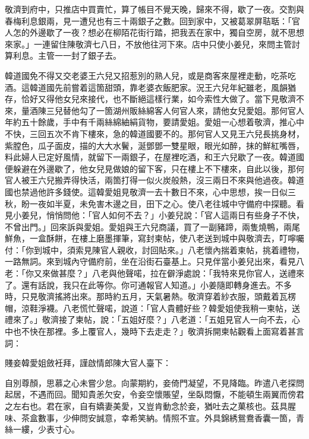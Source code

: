 敬濟到府中，只推店中買賣忙，算了帳目不覺天晚，歸來不得，歇了一夜。交割與春梅利息銀兩，見一遭兒也有三十兩銀子之數。回到家中，又被葛翠屏聐聒：「官人怎的外邊歇了一夜？想必在柳陌花街行踏，把我丟在家中，獨自空房，就不思想來家。」一連留住陳敬濟七八日，不放他往河下來。店中只使小姜兒，來問主管討算利息。主管一一封了銀子去。

韓道國免不得又交老婆王六兒又招惹別的熟人兒，{}或是商客來屋裡走動，吃茶吃酒。這韓道國先前嘗着這箇甜頭，靠老婆衣飯肥家。況王六兒年紀雖老，風韻猶存，恰好又得他女兒來接代，也不斷絕這樣行業，如今索性大做了。當下見敬濟不來，量酒陳三兒替他勾了一箇湖州販絲綿客人何官人來，請他女兒愛姐。那何官人年約五十餘歲，手中有千兩絲綿紬絹貨物，要請愛姐。愛姐一心想着敬濟，推心中不快，三回五次不肯下樓來，急的韓道國要不的。那何官人又見王六兒長挑身材，紫膛色，瓜子面皮，描的大大水鬢，涎鄧鄧一雙星眼，眼光如醉，抹的鮮紅嘴唇，料此婦人已定好風情，{}就留下一兩銀子，在屋裡吃酒，和王六兒歇了一夜。韓道國便躲避在外邊歇了，他女兒見做娘的留下客，只在樓上不下樓來，自此以後，那何官人被王六兒搬弄得快活，兩箇打得一似火炭般熱，沒三兩日不來與他過夜。韓道國也禁過他許多錢使。{}這韓愛姐見敬濟一去十數日不來，心中思想，挨一日似三秋，盼一夜如半夏，未免害木邊之目，田下之心。使八老往城中守備府中探聽。看見小姜兒，悄悄問他：「官人如何不去？」小姜兒說：「官人這兩日有些身子不快，不曾出門。」回來訴與愛姐。愛姐與王六兒商議，買了一副豬蹄，兩隻燒鴨，兩尾鮮魚，一盒酥餅，在樓上磨墨揮筆，寫封柬帖，使八老送到城中與敬濟去，叮嚀囑付：「你到城中，須索見陳官人親收，討回貼來。」八老懷內揣着柬帖，挑着禮物，一路無詞。來到城內守備府前，坐在沿街石臺基上。只見伴當小姜兒出來，看見八老：「你又來做甚麼？」八老與他聲喏，拉在僻淨處說：「我特來見你官人，送禮來了。還有話說，我只在此等你。你可通報官人知道。」小姜隨即轉身進去。不多時，只見敬濟搖將出來。那時約五月，天氣暑熱。敬濟穿着紗衣服，頭戴着瓦楞帽，涼鞋淨襪。八老慌忙聲喏，說道：「官人貴體好些？韓愛姐使我稍一柬帖，送禮來了。」敬濟接了柬帖，說：「五姐好麼？」八老道：「五姐見官人一向不去，心中也不快在那裡。多上覆官人，幾時下去走走？」敬濟拆開柬帖觀看上面寫着甚言詞：

\begin{myquote}[\markfont]
賤妾韓愛姐斂衽拜，謹啟情郎陳大官人臺下：

自別尊顏，思慕之心未嘗少怠。向蒙期約，妾倚門凝望，不見降臨。昨遣八老探問起居，不遇而回。聞知貴恙欠安，令妾空懷賬望，坐臥悶懨，不能頓生兩翼而傍君之左右也。君在家，自有嬌妻美愛，又豈肯動念於妾，猶吐去之菓核也。茲具腥味、茶盒數事，少伸問安誠意，幸希笑納。情照不宣。{}外具錦綉鴛鴦香囊一箇，青絲一縷，少表寸心。

\end{myquote}

